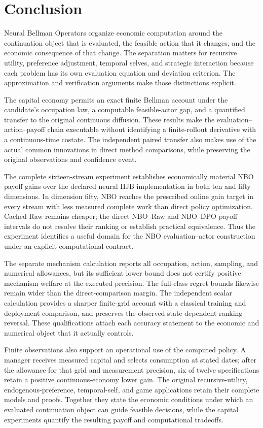 \section{Conclusion}\label{sec:conclusion}
Neural Bellman Operators organize economic computation around the continuation object that is evaluated, the feasible action that it changes, and the economic consequence of that change. The separation matters for recursive utility, preference adjustment, temporal selves, and strategic interaction because each problem has its own evaluation equation and deviation criterion. The approximation and verification arguments make those distinctions explicit.

The capital economy permits an exact finite Bellman account under the candidate's occupation law, a computable feasible-actor gap, and a quantified transfer to the original continuous diffusion. These results make the evaluation--action--payoff chain executable without identifying a finite-rollout derivative with a continuous-time costate. The independent paired transfer also makes use of the actual common innovations in direct method comparisons, while preserving the original observations and confidence event.

The complete sixteen-stream experiment establishes economically material NBO payoff gains over the declared neural HJB implementation in both ten and fifty dimensions. In dimension fifty, NBO reaches the prescribed online gain target in every stream with less measured complete work than direct policy optimization. Cached Raw remains cheaper; the direct NBO--Raw and NBO--DPO payoff intervals do not resolve their ranking or establish practical equivalence. Thus the experiment identifies a useful domain for the NBO evaluation--actor construction under an explicit computational contract.

The separate mechanism calculation reports all occupation, action, sampling, and numerical allowances, but its sufficient lower bound does not certify positive mechanism welfare at the executed precision. The full-class regret bounds likewise remain wider than the direct-comparison margin. The independent scalar calculation provides a sharper finite-grid account with a classical training and deployment comparison, and preserves the observed state-dependent ranking reversal. These qualifications attach each accuracy statement to the economic and numerical object that it actually controls.

Finite observations also support an operational use of the computed policy. A manager receives measured capital and selects consumption at stated dates; after the allowance for that grid and measurement precision, six of twelve specifications retain a positive continuous-economy lower gain. The original recursive-utility, endogenous-preference, temporal-self, and game applications retain their complete models and proofs. Together they state the economic conditions under which an evaluated continuation object can guide feasible decisions, while the capital experiments quantify the resulting payoff and computational tradeoffs.
